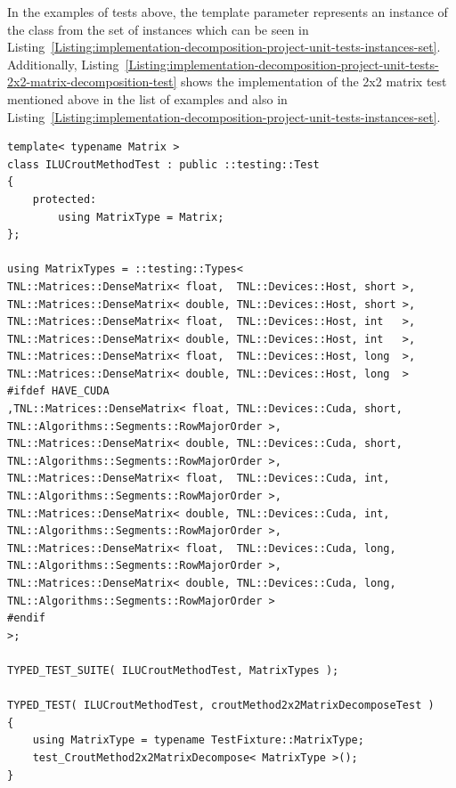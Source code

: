 In the examples of tests above, the  template parameter represents an instance of the  class from the set of instances which can be seen in Listing~\ref{Listing:implementation-decomposition-project-unit-tests-instances-set}. Additionally, Listing~\ref{Listing:implementation-decomposition-project-unit-tests-2x2-matrix-decomposition-test} shows the implementation of the 2x2 matrix test mentioned above in the list of examples and also in Listing~\ref{Listing:implementation-decomposition-project-unit-tests-instances-set}.

\begin{lstlisting}[caption={Implementation of the set of \code{DenseMatrix} instances and one test using GoogleTest. The unit tests are all run for each instance. The test suite is tied to the set of instances using \code{TYPED\_TEST\_SUITE} and each test is added to the test suite using the declaration \code{TYPED\_TEST}. Taken from the Decomposition project repository on GitLab\protect\footref{Footnote:decomposition-project-gitlab-url}.},label={Listing:implementation-decomposition-project-unit-tests-instances-set}]
template< typename Matrix >
class ILUCroutMethodTest : public ::testing::Test
{
	protected:
		using MatrixType = Matrix;
};

using MatrixTypes = ::testing::Types<
TNL::Matrices::DenseMatrix< float,  TNL::Devices::Host, short >,
TNL::Matrices::DenseMatrix< double, TNL::Devices::Host, short >,
TNL::Matrices::DenseMatrix< float,  TNL::Devices::Host, int   >,
TNL::Matrices::DenseMatrix< double, TNL::Devices::Host, int   >,
TNL::Matrices::DenseMatrix< float,  TNL::Devices::Host, long  >,
TNL::Matrices::DenseMatrix< double, TNL::Devices::Host, long  >
#ifdef HAVE_CUDA
,TNL::Matrices::DenseMatrix< float, TNL::Devices::Cuda, short, TNL::Algorithms::Segments::RowMajorOrder >,
TNL::Matrices::DenseMatrix< double, TNL::Devices::Cuda, short, TNL::Algorithms::Segments::RowMajorOrder >,
TNL::Matrices::DenseMatrix< float,  TNL::Devices::Cuda, int,   TNL::Algorithms::Segments::RowMajorOrder >,
TNL::Matrices::DenseMatrix< double, TNL::Devices::Cuda, int,   TNL::Algorithms::Segments::RowMajorOrder >,
TNL::Matrices::DenseMatrix< float,  TNL::Devices::Cuda, long,  TNL::Algorithms::Segments::RowMajorOrder >,
TNL::Matrices::DenseMatrix< double, TNL::Devices::Cuda, long,  TNL::Algorithms::Segments::RowMajorOrder >
#endif
>;

TYPED_TEST_SUITE( ILUCroutMethodTest, MatrixTypes );

TYPED_TEST( ILUCroutMethodTest, croutMethod2x2MatrixDecomposeTest )
{
	using MatrixType = typename TestFixture::MatrixType;
	test_CroutMethod2x2MatrixDecompose< MatrixType >();
}
\end{lstlisting}


